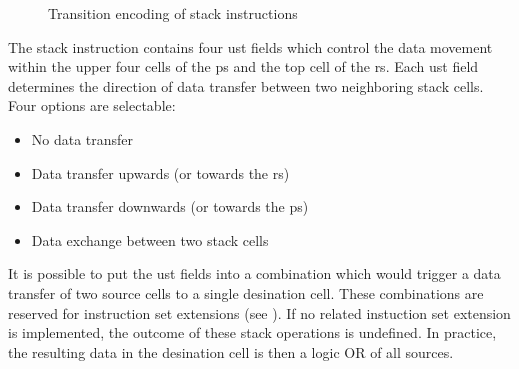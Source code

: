 \begin{figure}[!h]
{{
    }
  }
  \caption{Transition encoding of stack instructions}
  \label{opcodes:stack:transpat}
\end{figure}

The stack instruction contains four \gls{ust} fields which control the data movement within
the upper four \glspl{cell} of the \gls{ps} and the top \gls{cell} of the \gls{rs}. Each
\gls{ust} field determines the direction of data transfer between two neighboring stack
\glspl{cell}. Four options are selectable:
\begin{itemize}
  \item No data transfer
  \item Data transfer upwards (or towards the \gls{rs})
  \item Data transfer downwards (or towards the \gls{ps})
  \item Data exchange between two stack \glspl{cell}
\end{itemize}
It is possible to put the \gls{ust} fields into a combination which would trigger a data transfer of two
source \glspl{cell} to a single desination \gls{cell}.  
These combinations are reserved for instruction set extensions (see ).
If no related instuction set extension is implemented, the outcome of these stack operations is undefined. 
In practice, the resulting data in the desination \gls{cell} is then a logic OR of all sources.

